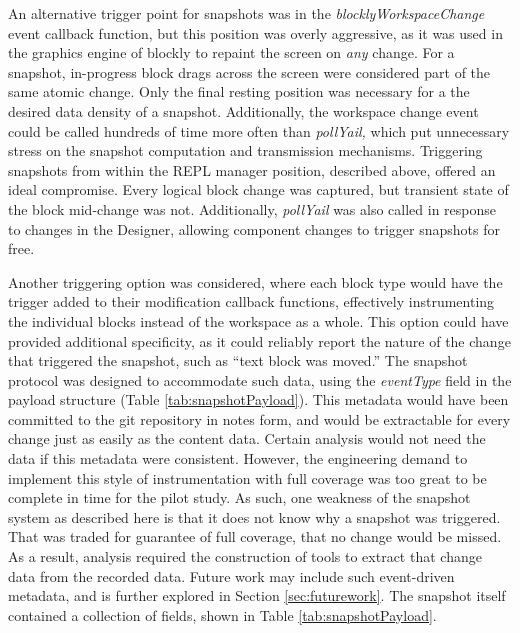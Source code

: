 An alternative trigger point for snapshots was in the \emph{blocklyWorkspaceChange} event callback function, but this position was overly aggressive, as it was used in the graphics engine of blockly to repaint the screen on \emph{any} change. For a snapshot, in-progress block drags across the screen were considered part of the same atomic change. Only the final resting position was necessary for a the desired data density of a snapshot. Additionally, the workspace change event could be called hundreds of time more often than \emph{pollYail,} which put unnecessary stress on the snapshot computation and transmission mechanisms. Triggering snapshots from within the REPL manager position, described above, offered an ideal compromise. Every logical block change was captured, but transient state of the block mid-change was not. Additionally, \emph{pollYail} was also called in response to changes in the Designer, allowing component changes to trigger snapshots for free.

Another triggering option was considered, where each block type would have the trigger added to their modification callback functions, effectively instrumenting the individual blocks instead of the workspace as a whole. This option could have provided additional specificity, as it could reliably report the nature of the change that triggered the snapshot, such as ``text block was moved.'' The snapshot protocol was designed to accommodate such data, using the \emph{eventType} field in the payload structure (Table \ref{tab:snapshotPayload}). This metadata would have been committed to the git repository in notes form, and would be extractable for every change just as easily as the content data. Certain analysis would not need the data if this metadata were consistent. However, the engineering demand to implement this style of instrumentation with full coverage was too great to be complete in time for the pilot study. As such, one weakness of the snapshot system as described here is that it does not know why a snapshot was triggered. That was traded for guarantee of full coverage, that no change would be missed. As a result, analysis required the construction of tools to extract that change data from the recorded data. Future work may include such event-driven metadata, and is further explored in Section \ref{sec:futurework}. The snapshot itself contained a collection of fields, shown in Table \ref{tab:snapshotPayload}. 

